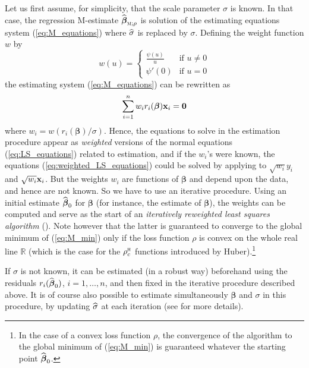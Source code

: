 Let us first assume, for simplicity, that the scale parameter $\sigma$ is
known. In that case, the regression M-estimate
$\sthat{\boldsymbol\beta}_{\stsc{M};\rho}$ is solution of the estimating
equations system (\ref{eq:M_equations}) where $\widehat{\sigma}$ is replaced by
$\sigma$. Defining the weight function $w$ by
\[
    w(u) = 
    \begin{cases}
        \frac{\psi(u)}{u} & \text{if $u\neq0$}\\
        \psi'(0)          & \text{if $u=0$}
    \end{cases}
\]
the estimating system (\ref{eq:M_equations}) can be rewritten as
%
\begin{equation}\label{eq:weighted_LS_equations}
    \sum_{i=1}^{n} w_{i} r_{i}(\boldsymbol\beta) \mathbf x_{i} = \mathbf 0
\end{equation}
%
where $w_{i} = w(r_{i}(\boldsymbol\beta)/\sigma)$. Hence, the equations to
solve in the  estimation procedure appear as \emph{weighted} versions
of the normal equations (\ref{eq:LS_equations}) related to 
estimation, and if the $w_{i}$'s were known, the equations
(\ref{eq:weighted_LS_equations}) could be solved by applying  to
$\sqrt{w_{i}}y_{i}$ and $\sqrt{w_{i}}\mathbf x_{i}$. But the weights $w_{i}$
are functions of $\boldsymbol\beta$ and depend upon the data, and hence are not
known. So we have to use an iterative procedure. Using an initial estimate
$\widehat{\boldsymbol\beta}_0$ for $\boldsymbol\beta$ (for instance, the
 estimate of $\boldsymbol\beta$), the weights can be computed and
serve as the start of an \emph{iteratively reweighted least squares algorithm}
(). Note however that the latter is guaranteed to converge to the
global minimum of (\ref{eq:M_min}) only if the loss function $\rho$ is convex
on the whole real line $\mathbb{R}$ (which is the case for the
$\rho_{c}^{\stsc{H}}$ functions introduced by Huber).\footnote{In the case of
a convex loss function $\rho$, the convergence of the algorithm to the global
minimum of (\ref{eq:M_min}) is guaranteed whatever the starting point
$\widehat{\boldsymbol\beta}_0$.}

If $\sigma$ is not known, it can be estimated (in a robust way) beforehand
using the residuals $r_{i}(\widehat{\boldsymbol\beta}_0)$, $i = 1, \dots, n$,
and then fixed in the iterative procedure described above. It is of course
also possible to estimate simultaneously $\boldsymbol\beta$ and $\sigma$ in
this procedure, by updating $\widehat{\sigma}$ at each iteration (see
\citealp{maronna:etal:2006} for more details).

